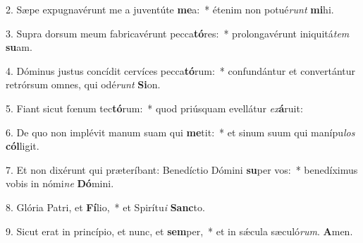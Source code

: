 2. Sæpe expugnavérunt me a juventúte \textbf{me}a:~*  étenim non potué\textit{runt} \textbf{mi}hi.\

3. Supra dorsum meum fabricavérunt pecca\textbf{tó}res:~*  prolongavérunt iniquitá\textit{tem} \textbf{su}am.\

4. Dóminus justus concídit cervíces pecca\textbf{tó}rum:~*  confundántur et convertántur retrórsum omnes, qui odé\textit{runt} \textbf{Si}on.\

5. Fiant sicut fœnum tec\textbf{tó}rum:~*  quod priúsquam evellátur \textit{ex}\textbf{á}ruit:\

6. De quo non implévit manum suam qui \textbf{me}tit:~*  et sinum suum qui manípu\textit{los} \textbf{cól}ligit.\

7. Et non dixérunt qui præteríbant: Benedíctio Dómini \textbf{su}per vos:~*  benedíximus vobis in nómi\textit{ne} \textbf{Dó}mini.\

8. Glória Patri, et \textbf{Fí}lio,~*  et Spirítu\textit{i} \textbf{Sanc}to.\

9. Sicut erat in princípio, et nunc, et \textbf{sem}per,~*  et in sǽcula sæculó\textit{rum}. \textbf{A}men.\

